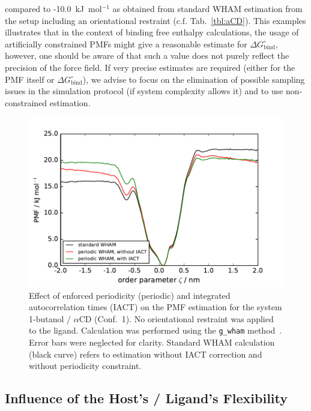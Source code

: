 \documentclass[9pt,lessons]{livecoms}
\begin{document}
compared to -10.0~kJ~mol$^{-1}$ as obtained from standard WHAM estimation from the setup including an orientational restraint (c.f. Tab.~\ref{tbl:aCD}).
This examples illustrates that in the context of binding free enthalpy calculations, the usage of artificially constrained PMFs might give a reasonable estimate for $\Delta G^\circ_\mathrm{bind}$, 
however, one should be aware of that such a value does not purely reflect the precision of the force field.
If very precise estimates are required (either for the PMF itself or $\Delta G^\circ_\mathrm{bind}$), we advise to focus on the elimination of possible sampling issues in the simulation protocol (if system complexity allows it) 
and to use non-constrained estimation.

\begin{figure}
\includegraphics[width=\linewidth]{figures/pmf_aCD_BTL_gwham_cyclic.pdf}
  \caption{Effect of enforced periodicity (periodic) and integrated autocorrelation times (IACT) on the PMF estimation for the system 1-butanol / $\alpha$CD (Conf.~1).
  No orientational restraint was applied to the ligand.
  Calculation was performed using the \texttt{g\_wham} method~\cite{hub2010g_wham}. Error bars were neglected for clarity.
  Standard WHAM calculation (black curve) refers to estimation without IACT correction and without periodicity constraint.
  }
  \label{fig:gwham}
\end{figure}


\subsection{Influence of the Host's / Ligand's Flexibility}
\end{document}

